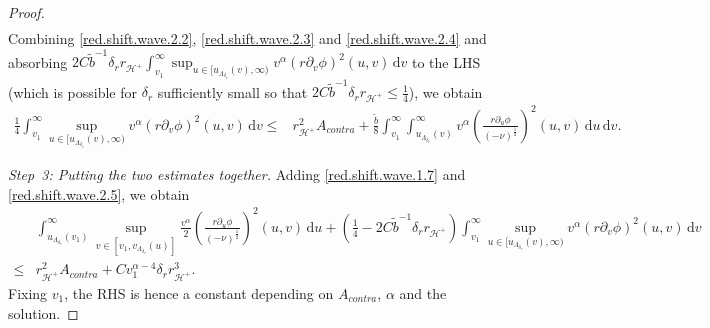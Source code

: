 \documentclass[10pt, reqno]{amsart}
\theoremstyle{definition}
\theoremstyle{remark}
\theoremstyle{conjecture}
\numberwithin{equation}{section}
\newcommand{\ud}{\mathrm{d}}
\newcommand{\rd}{\partial}
\newcommand{\0}{\emptyset}
\newcommand{\alp}{\alpha}
\newcommand{\calH}{\mathcal H}
\newcommand{\f}{\frac}
\newcommand{\de}{\delta}
\newcommand{\EH}{\calH^{+}}
\newcommand{\pfstep}[1]{\vspace{.5em} {\it \noindent #1.}}
\begin{document}
\begin{proof}
\begin{equation}
\begin{split}
\end{split}
\end{equation}
Combining \eqref{red.shift.wave.2.2}, \eqref{red.shift.wave.2.3} and \eqref{red.shift.wave.2.4} and absorbing $2C\tilde{b}^{-1} {\de_r} r_{\EH} \int_{v_1}^\infty \sup_{u\in [u_{\Lambda_{\de_r}}(v),\infty)} v^{\alp}(r\rd_v\phi)^2(u,v)\, \ud v$ to the LHS (which is possible for ${\de_r}$ sufficiently small so that $2C\tilde{b}^{-1}{\de_r} r_{\EH}\leq \f 14$), we obtain
\begin{equation}\label{red.shift.wave.2.5}
\begin{split}
\f 14\int_{v_1}^\infty \sup_{u\in [u_{\Lambda_{\de_r}}(v),\infty)} v^{\alp}(r\rd_v\phi)^2(u,v)\, \ud v
\leq & r_{\EH}^2 A_{contra}+ \f{\tilde{b}}{8}\int_{v_1}^\infty\int_{u_{\Lambda_{\de_r}}(v)}^\infty v^{\alp} \left(\f{r\rd_u\phi}{(-\nu)^{\f 12}}\right)^2(u,v) \, \ud u\, \ud v.
\end{split}
\end{equation}

\pfstep{Step~3: Putting the two estimates together}
Adding \eqref{red.shift.wave.1.7} and \eqref{red.shift.wave.2.5}, we obtain
\begin{equation}\label{red.shift.wave.combined.1}
\begin{split}
&\int_{u_{\Lambda_{\de_r}}(v_1)}^\infty\sup_{v\in [v_1, v_{\Lambda_{\de_r}}(u)]}\f {v^{\alp}}2 \left(\f{r\rd_u\phi}{(-\nu)^{\f 12}}\right)^2(u,v)\, \ud u+ (\f 14-2C\tilde{b}^{-1} \de_r r_{\EH})\int_{v_1}^\infty \sup_{u\in [u_{\Lambda_{\de_r}}(v),\infty)} v^{\alp}(r\rd_v\phi)^2(u,v)\, \ud v\\
\leq &r_{\EH}^2 A_{contra}+C v_1^{\alp-4}{\de_r} r_{\EH}^3.
\end{split}
\end{equation}
Fixing $v_1$, the RHS is hence a constant depending on $A_{contra}$, $\alp$ and the solution.


\end{proof}
\end{document}
